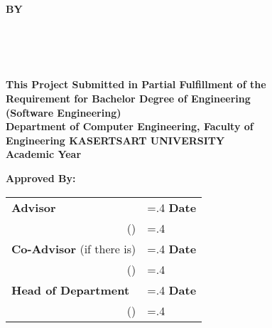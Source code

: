 \thispagestyle{empty}
\begin{center}
    {\huge\textbf{\usevar{\srsTitle}}}\vspace{1in}

    {\huge\textbf{BY}}\vspace{.5in}

    {\huge\textbf{%
        \usevar{\srsAuthorOne} \\
        \usevar{\srsAuthorTwo} \\
        \usevar{\srsAuthorThree} \\
    }}\vfill

    {\large\textbf{%
        This Project Submitted in Partial Fulfillment of the\\
        Requirement for Bachelor Degree of Engineering\\
        (Software Engineering)\\
        Department of Computer Engineering, Faculty of\\
        Engineering KASERTSART UNIVERSITY\\
        Academic Year \usevar{\srsAcademicYear}\\
    }}
\end{center}

\vspace{.5in}

{\large\textbf{Approved By:}}\vspace{.2in}

\begin{tabularx}{1\textwidth}{X >{\hsize=.4\hsize}X}
    \textbf{Advisor}\dotfill & \textbf{Date}\dotfill \\
    \multicolumn{1}{r}{(\usevar{\srsAdvisorName})} & \\[.1in]

    \textbf{Co-Advisor} (if there is)\dotfill & \textbf{Date}\dotfill \\
    \multicolumn{1}{r}{(\usevar{\srsCoAdvisorName})} & \\[.1in]
    
    \textbf{Head of Department}\dotfill & \textbf{Date}\dotfill \\
    \multicolumn{1}{r}{(\usevar{\srsHoDName})} & \\
\end{tabularx}

\restoregeometry